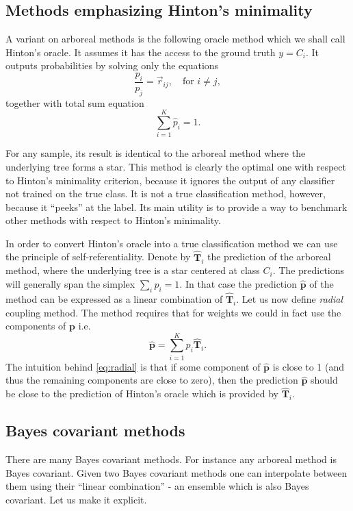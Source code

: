 \documentclass[twoside,11pt]{article}
\begin{document}
\subsection{Methods emphasizing Hinton's minimality}

A variant on arboreal methods is the following oracle method which we shall call Hinton's oracle. It  assumes it has the access to the ground truth $y = C_i$. It outputs probabilities by solving only the equations
$$
\frac{p_i}{p_j} = \vec{r}_{ij},\quad \textrm{for }i\not = j,
$$
together  with total sum equation
$$
\sum_{i=1}^K  \hat p_i = 1.
$$

For any sample, its result is identical to the arboreal method where the underlying tree forms a star. This method is clearly the optimal one with respect to Hinton's minimality criterion, because it ignores the output of any classifier not trained on the true class. It is not a true classification method, however, because it ``peeks'' at the label. Its main utility is to provide a way to benchmark other methods with respect to Hinton's minimality.

In order to convert Hinton's oracle into a true classification method we can use the principle of self-referentiality.  Denote by $\hat{\boldsymbol{T}}_i$ the prediction of the arboreal method, where the underlying tree is a star centered at class $C_i$. The predictions will generally span the simplex $\sum_i \hat p_i = 1$. In that case the prediction $\hat{\boldsymbol{p}}$ of the method  can be expressed as a linear combination of $\hat{\boldsymbol{T}}_i$. Let us now define \emph{radial} coupling method. The  method requires that for  weights we could in fact use the components of $\boldsymbol{p}$ i.e.
\begin{equation}
	\hat {\boldsymbol{p}} = \sum_{i=1}^K p_i \hat{\boldsymbol{T}}_i. \label{eq:radial}
\end{equation}
%
The intuition behind \eqref{eq:radial} is that if some component of $\hat{\boldsymbol{p}}$ is close to 1 (and thus the remaining components are close to zero), then the prediction $\hat{\boldsymbol{p}}$ should be close to the prediction of Hinton's oracle which is provided by $\hat{\boldsymbol{T}}_i$.

\subsection{Bayes covariant methods}

There are many Bayes covariant methods. For instance any arboreal method is Bayes covariant. Given two Bayes covariant methods one can interpolate between them using their ``linear combination'' - an ensemble which is also Bayes covariant. Let us make it explicit.
\end{document}
